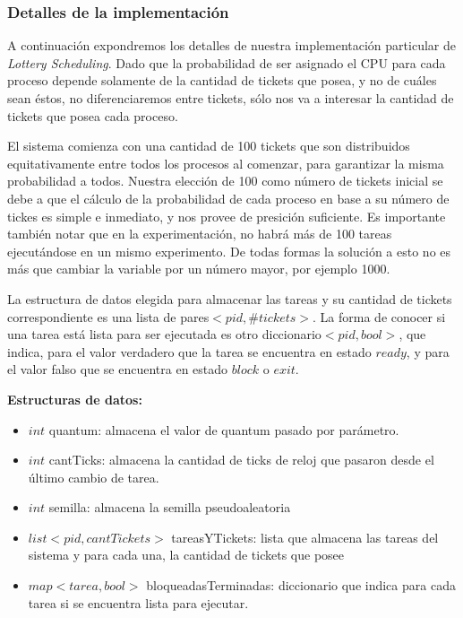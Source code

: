 \subsubsection{Detalles de la implementaci\'on}

A continuaci\'on expondremos los detalles de nuestra implementaci\'on particular de \textit{Lottery Scheduling}. Dado que la probabilidad de ser asignado el CPU para cada proceso depende solamente de la cantidad de tickets que posea, y no de cu\'ales sean \'estos, no diferenciaremos entre tickets, s\'olo nos va a interesar la cantidad de tickets que posea cada proceso.


\vspace{2mm}

El sistema comienza con una cantidad de 100 tickets que son distribuidos equitativamente entre todos los procesos al comenzar, para garantizar la misma probabilidad a todos. Nuestra elecci\'on de 100 como n\'umero de tickets inicial se debe a que el c\'alculo de la probabilidad de cada proceso en base a su n\'umero de tickes es simple e inmediato, y nos provee de presici\'on suficiente. Es importante tambi\'en notar que en la experimentaci\'on, no habr\'a m\'as de 100 tareas ejecut\'andose en un mismo experimento. De todas formas la soluci\'on a esto no es m\'as que cambiar la variable por un n\'umero mayor, por ejemplo 1000.

\vspace{2mm}

La estructura de datos elegida para almacenar las tareas y su cantidad de tickets correspondiente es una lista de pares$<pid, \#tickets>$. La forma de conocer si una tarea est\'a lista para ser ejecutada es otro diccionario$<pid, bool>$, que indica, para el valor verdadero que la tarea se encuentra en estado $ready$, y para el valor falso que se encuentra en estado $block$ o $exit$.

\vspace{2mm}

\textbf{Estructuras de datos:}

\begin{itemize}

\item $int$ quantum: almacena el valor de quantum pasado por par\'ametro.

\item $int$ cantTicks: almacena la cantidad de ticks de reloj que pasaron desde el \'ultimo cambio de tarea.

\item $int$ semilla: almacena la semilla pseudoaleatoria

\item $list<pid, cantTickets>$ tareasYTickets: lista que almacena las tareas del sistema y para cada una, la cantidad de tickets que posee

\item $map<tarea, bool>$ bloqueadasTerminadas: diccionario que indica para cada tarea si se encuentra lista para ejecutar.

\end{itemize}


